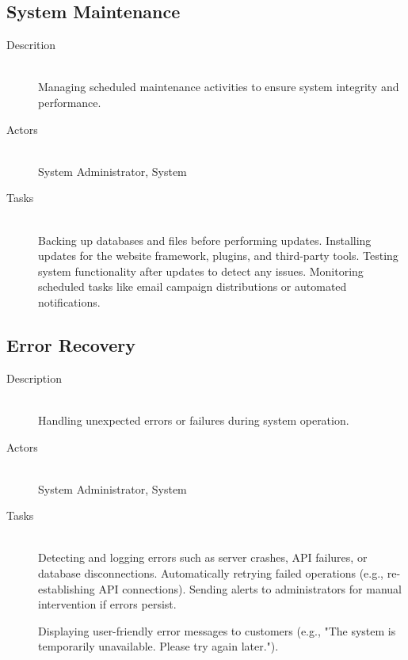 \documentclass[twoside,a4paper,journal]{IEEEtran}
\begin{document}
\subsection{System Maintenance}
\begin{description}
  \item[Descrition] \hfill \\
    Managing scheduled maintenance activities to ensure system integrity and
    performance.
  \item[Actors] \hfill \\
    System Administrator, System
  \item[Tasks] \hfill \\
    Backing up databases and files before performing updates.
    Installing updates for the website framework, plugins, and third-party
    tools.
    Testing system functionality after updates to detect any issues.
    Monitoring scheduled tasks like email campaign distributions or automated
    notifications.
\end{description}

\subsection{Error Recovery}
\begin{description}
  \item[Description] \hfill \\
    Handling unexpected errors or failures during system operation.
  \item[Actors] \hfill \\
    System Administrator, System
  \item[Tasks] \hfill \\
    Detecting and logging errors such as server crashes, API failures, or
    database disconnections.
    Automatically retrying failed operations (e.g., re-establishing API
    connections).
    Sending alerts to administrators for manual intervention if errors persist.

    Displaying user-friendly error messages to customers (e.g., "The system is
    temporarily unavailable. Please try again later.").
\end{description}
\end{document}
